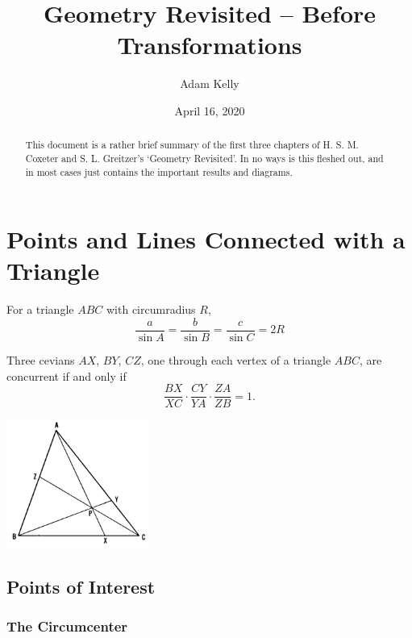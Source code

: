 \documentclass[DIV=12, a4]{scrartcl}
\title{Geometry Revisited -- Before Transformations}
\author{Adam Kelly}
\date{April 16, 2020}
\begin{document}
\maketitle

\begin{abstract}
	This document is a rather brief summary of the first three chapters of H. S. M. Coxeter and S. L. Greitzer's `Geometry Revisited'.
	In no ways is this fleshed out, and in most cases just contains the important results and diagrams.
\end{abstract}

\tableofcontents

\clearpage
\section{Points and Lines Connected with a Triangle}

\begin{theorem}
	For a triangle $ABC$ with circumradius $R$,
	$$
	\frac{a}{\sin A} = \frac{b}{\sin B} = \frac{c}{\sin C} = 2R
	$$
\end{theorem}

\begin{theorem}
	Three cevians $AX$, $BY$, $CZ$, one through each vertex of a triangle $ABC$, are concurrent if and only if
	$$
	\frac{BX}{XC} \cdot \frac{CY}{YA}\cdot \frac{ZA}{ZB} = 1.
	$$
\end{theorem}
\begin{center}
	\includegraphics[width=0.35\textwidth]{media/1-2A}
\end{center}

\subsection{Points of Interest}

\subsubsection{The Circumcenter}
\end{document}
